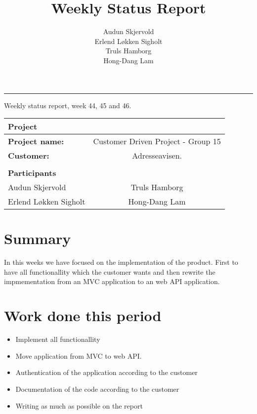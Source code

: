 \documentclass[12pt, a4paper]{article}
\title{Weekly Status Report}
\author{Audun Skjervold \\ Erlend Løkken Sigholt \\ Truls Hamborg \\ Hong-Dang Lam}
\begin{document}
\maketitle
\newpage

 
\newpage
\hrule
\newpage

\begin{center}
Weekly status report, week 44, 45 and 46.
  \begin{tabular}{| l  c |}
    \hline
    Project & \\ \hline
    \textbf{Project name:} & Customer Driven Project - Group 15 \\
    \textbf{Customer:} & Adresseavisen. \\ \hline
     & \\
     \textbf{Participants} & \\ \hline
     Audun Skjervold & Truls Hamborg \\
     Erlend Løkken Sigholt & Hong-Dang Lam \\
    \hline
  \end{tabular}
  \end{center}




\section{Summary}
In this weeks we have focused on the implementation of the product. First to have all functionallity which the customer wants and then rewrite the impmementation from an MVC application to an web API application. 
\section{Work done this period}

\begin{itemize}
  \item Implement all functionallity
  \item Move application from MVC to web API. 
  \item Authentication of the application according to the customer
  \item Documentation of the code according to the customer
  \item Writing as much as possible on the report
\end{itemize}
\end{document}
